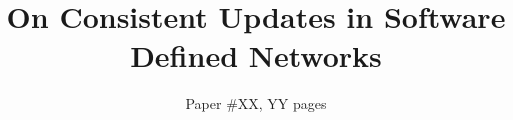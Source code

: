 \documentclass{sig-alternate-10pt-2013}
\title{On Consistent Updates in Software Defined Networks}
\author{
Paper \#XX, YY pages
}
\begin{document}
\maketitle

\newcommand{\paragraphb}[1]{\vspace{0.03in}\noindent{\bf #1} }
\newcommand{\paragraphe}[1]{\vspace{0.03in}\noindent{\em #1} }
\newcommand{\paragraphbe}[1]{\vspace{0.03in}\noindent{\bf \em #1} }

\newcommand{\prooffontsize}{\fontsize{8pt}{9.3pt}\selectfont}
\newcommand{\cready}{\textcolor{black}}
\newcommand{\newcomment}{\textcolor{black}}

\newcommand{\ratul}[1]{{\color{blue}{#1}}}
\newcommand{\roger}[1]{{\color{green}{#1}}}

\newcommand{\swan}{\normalsize S{\small WAN}\xspace}
\newcommand{\swansmall}{\small S{\scriptsize WAN}\xspace}
\newcommand{\cflow}{Vflow\xspace}
\newcommand{\flow}{vflow\xspace}
\newcommand{\flows}{vflows\xspace}

\newcommand{\topolarge}{\textsf{IDN}\xspace}
\newcommand{\toposmall}{\textsf{G-Scale}\xspace}

\newcommand{\corule}{Rule\xspace}
\newcommand{\orule}{rule\xspace}
\newcommand{\orules}{rules\xspace}

\newcommand{\cpr}{Service\xspace}
\newcommand{\pr}{service\xspace}

\newcommand{\cprops}{Service properties\xspace}
\newcommand{\props}{service properties\xspace}

\newcommand{\trurl}{\url{http://somewhere}}

\newcommand{\fixme}[1]{{\bf\textcolor{red}{[#1]}}}

\newcommand{\helpme}[1]{{\bf\textcolor{red}{#1}}}

\newcommand{\figtocapskip}{\vspace{-6pt}}
\newcommand{\figtocapbigskip}{\vspace{-9pt}}

\theoremstyle{definition}
\newtheorem{lemma}{Lemma}


\begin{sloppypar}

%





{
\scriptsize
\baselineskip=7.685bp


}
%

\begin{appendix}

\end{appendix}

\end{sloppypar}
\end{document}
